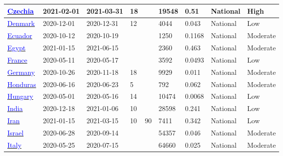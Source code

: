 \begin{table}[!ht]
\begin{center}
\begin{tabular}{p{2cm} | p{1.6cm} | p{1.6cm} | p{0.8cm} | p{0.8cm} | p{1cm} | p{1.3cm} | p{1.2cm} | p{1.2cm}}
           \hline 
           \href{https://doi.org/10.1038/s43856-022-00080-0}{\textcolor{blue}{Czechia}} & 2021-02-01 & 2021-03-31 & 18 &  & 19548 & 0.51 & National & High \\ 
           \hline 
           \href{https://dx.doi.org/10.1007/s10654-021-00796-8}{\textcolor{blue}{Denmark}} & 2020-12-01 & 2020-12-31 & 12 &  & 4044 & 0.043 & National & Low \\ 
           \hline 
           \href{https://dx.doi.org/10.3389/fmed.2022.933260}{\textcolor{blue}{Ecuador}} & 2020-10-12 & 2020-10-19 &  &  & 1250 & 0.1168 & National & Moderate \\ 
           \hline 
           \href{https://dx.doi.org/10.1186/s41182-022-00448-x}{\textcolor{blue}{Egypt}} & 2021-01-15 & 2021-06-15 &  &  & 2360 & 0.463 & National & Moderate \\ 
           \hline 
           \href{https://dx.doi.org/10.1038/s41467-021-23233-6}{\textcolor{blue}{France}} & 2020-05-11 & 2020-05-17 &  &  & 3592 & 0.0493 & National & Low \\ 
           \hline 
           \href{https://www.ifo.de/en/publikationen/2020/monograph-authorship/die-deutschen-und-corona}{\textcolor{blue}{Germany}} & 2020-10-26 & 2020-11-18 & 18 &  & 9929 & 0.011 & National & Moderate \\ 
           \hline 
           \href{https://revistas.ucr.ac.cr/index.php/psm/article/view/43261/46175}{\textcolor{blue}{Honduras}} & 2020-06-16 & 2020-06-23 & 5 &  & 792 & 0.062 & National & Moderate \\ 
           \hline 
           \href{https://dx.doi.org/10.1007/s11357-020-00226-9}{\textcolor{blue}{Hungary}} & 2020-05-01 & 2020-05-16 & 14 &  & 10474 & 0.0068 & National & Low \\ 
           \hline 
           \href{http://dx.doi.org/10.1016/j.ijid.2021.05.040}{\textcolor{blue}{India}} & 2020-12-18 & 2021-01-06 & 10 &  & 28598 & 0.241 & National & Low \\ 
           \hline 
           \href{https://dx.doi.org/10.1186/s12889-022-13464-7}{\textcolor{blue}{Iran}} & 2021-01-15 & 2021-03-15 & 10 & 90 & 7411 & 0.342 & National & Low \\ 
           \hline 
           \href{https://dx.doi.org/10.1007/s10654-021-00749-1}{\textcolor{blue}{Israel}} & 2020-06-28 & 2020-09-14 &  &  & 54357 & 0.046 & National & Moderate \\ 
           \hline 
           \href{https://www.istat.it/it/files//2020/08/ReportPrimiRisultatiIndagineSiero.pdf}{\textcolor{blue}{Italy}} & 2020-05-25 & 2020-07-15 &  &  & 64660 & 0.025 & National & Moderate \\ 

\end{tabular}
\end{center}
\end{table}
